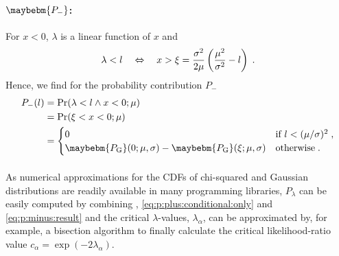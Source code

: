 \documentclass[a4paper]{article}
\newcommand*\PG{\maybebm{P_\mathrm{G}}\xspace}
\begin{document}
\paragraph{$\maybebm{P_-}$:}
For $x<0$, $\lambda$ is a linear function of $x$ and
%
\begin{equation*}
  \lambda < l
  \quad \Leftrightarrow \quad
  x > \xi = \frac{\sigma^2}{2\mu} \left( \frac{\mu^2}{\sigma^2} - l \right)
  \;.
\end{equation*}
%
Hence, we find for the probability contribution $P_-$
%
\begin{align}
  P_-(l)
  & =
  \Pr(\lambda < l \wedge x < 0; \mu)
  \nonumber
  \\
  & =
  \Pr(\xi < x < 0; \mu)
  \nonumber
  \\
  & =
  \begin{cases}
    \displaystyle
    0 & \text{if } l < (\mu/\sigma)^2 \fcomma \\
    \displaystyle
    \PG(0; \mu, \sigma) - \PG(\xi; \mu, \sigma) & \text{otherwise} \fstop
  \end{cases}
  \label{eq:p:minus:result}
\end{align}
%

\paragraph{}
As numerical approximations for the CDFs of chi-squared and Gaussian
distributions are readily available in many programming libraries,
$P_\lambda$ can be easily computed by combining ,
\eqref{eq:p:plus:conditional:only} and \eqref{eq:p:minus:result} and the
critical $\lambda$-values, $\lambda_\alpha$, can be approximated by, for
example, a bisection algorithm to finally calculate the critical
likelihood-ratio value $c_\alpha = \exp(-2\lambda_\alpha)$.

\printbibliography[heading=bibintoc]
\end{document}
